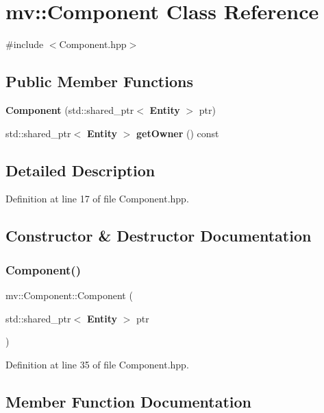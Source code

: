 \section{mv\+:\+:Component Class Reference}
\label{classmv_1_1_component}


{\ttfamily \#include $<$Component.\+hpp$>$}

\subsection*{Public Member Functions}
\begin{DoxyCompactItemize}
\item 
\textbf{ Component} (std\+::shared\+\_\+ptr$<$ \textbf{ Entity} $>$ ptr)
\item 
std\+::shared\+\_\+ptr$<$ \textbf{ Entity} $>$ \textbf{ get\+Owner} () const
\end{DoxyCompactItemize}


\subsection{Detailed Description}


Definition at line 17 of file Component.\+hpp.



\subsection{Constructor \& Destructor Documentation}
\mbox{\label{classmv_1_1_component_a605a74ffe7181bfe7f867be3355ceeb1}} 
\subsubsection{Component()}
{\footnotesize\ttfamily mv\+::\+Component\+::\+Component (\begin{DoxyParamCaption}\item[{std\+::shared\+\_\+ptr$<$ \textbf{ Entity} $>$}]{ptr }\end{DoxyParamCaption})\hspace{0.3cm}{\ttfamily [inline]}}



Definition at line 35 of file Component.\+hpp.



\subsection{Member Function Documentation}
\mbox{\label{classmv_1_1_component_a052375418956ec0810e9cdf4bbc18c69}} 
